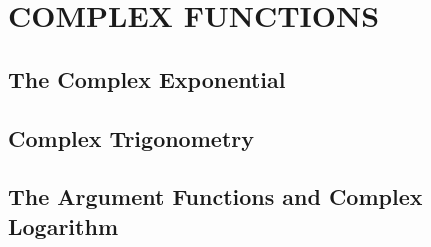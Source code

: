 \section{COMPLEX FUNCTIONS}
\subsection{The Complex Exponential}
\subsection{Complex Trigonometry}
\subsection{The Argument Functions and Complex Logarithm}
